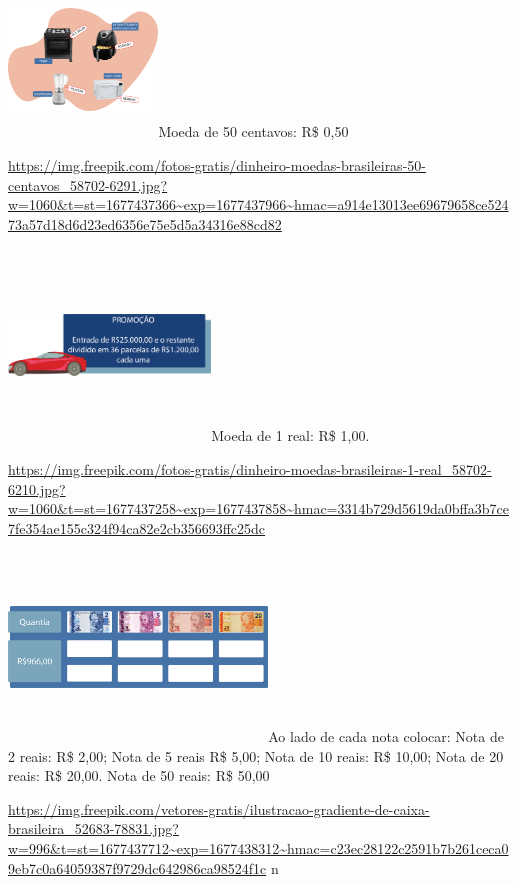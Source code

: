 \begin{escolha}
{\includegraphics[width=1.56667in,height=1.61849in]{media/image67.png}Moeda
de 50 centavos: R\$ 0,50

\url{https://img.freepik.com/fotos-gratis/dinheiro-moedas-brasileiras-50-centavos_58702-6291.jpg?w=1060\&t=st=1677437366~exp=1677437966~hmac=a914e13013ee69679658ce52473a57d18d6d23ed6356e75e5d5a34316e88cd82}

\includegraphics[width=2.11667in,height=2.01180in]{media/image68.png}Moeda
de 1 real: R\$ 1,00.

\url{https://img.freepik.com/fotos-gratis/dinheiro-moedas-brasileiras-1-real_58702-6210.jpg?w=1060\&t=st=1677437258~exp=1677437858~hmac=3314b729d5619da0bffa3b7ce7fe354ae155c324f94ca82e2cb356693ffc25dc}

\includegraphics[width=2.71068in,height=1.97500in]{media/image69.png}Ao
lado de cada nota colocar: Nota de 2 reais: R\$ 2,00; Nota de 5 reais
R\$ 5,00; Nota de 10 reais: R\$ 10,00; Nota de 20 reais: R\$ 20,00. Nota
de 50 reais: R\$ 50,00

\url{https://img.freepik.com/vetores-gratis/ilustracao-gradiente-de-caixa-brasileira_52683-78831.jpg?w=996\&t=st=1677437712~exp=1677438312~hmac=c23ec28122c2591b7b261ceca09eb7c0a64059387f9729dc642986ca98524f1c}
n

}
\end{escolha}
